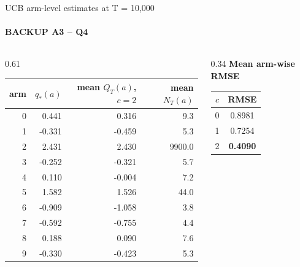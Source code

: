 \begin{frame}{UCB arm-level estimates at T = 10,000}
  \framesubtitle{BACKUP A3 -- Q4}
  \vspace{0.04cm}
  \begin{columns}[T,onlytextwidth]
    \begin{column}{0.61\textwidth}
      {\fontsize{8.6}{10.3}\selectfont
      \begin{tabular}{@{}rrrr@{}}
        \toprule
        arm & \(q_*(a)\) & mean \(Q_T(a)\), \(c=2\) & mean \(N_T(a)\)\\
        \midrule
        0 &  0.441 &  0.316 & 9.3\\
        1 & -0.331 & -0.459 & 5.3\\
        2 &  2.431 &  2.430 & 9900.0\\
        3 & -0.252 & -0.321 & 5.7\\
        4 &  0.110 & -0.004 & 7.2\\
        5 &  1.582 &  1.526 & 44.0\\
        6 & -0.909 & -1.058 & 3.8\\
        7 & -0.592 & -0.755 & 4.4\\
        8 &  0.188 &  0.090 & 7.6\\
        9 & -0.330 & -0.423 & 5.3\\
        \bottomrule
      \end{tabular}}
    \end{column}
    \begin{column}{0.34\textwidth}
      \textbf{Mean arm-wise RMSE}
      \vspace{0.12cm}
      \begin{tabular}{@{}cc@{}}
        \toprule
        \(c\) & RMSE\\
        \midrule
        0 & 0.8981\\
        1 & 0.7254\\
        2 & \textbf{0.4090}\\
        \bottomrule
      \end{tabular}\par
      \vspace{0.24cm}
    \end{column}
  \end{columns}
\end{frame}
